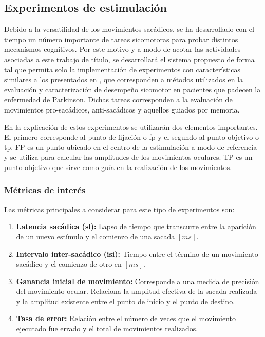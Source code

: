 \documentclass[../main.tex]{subfiles}
\begin{document}
		\subsection{Experimentos de estimulación}
		\label{sub:02_experimentos_de_estimulacion}
			Debido a la versatilidad de los movimientos sacádicos, se ha desarrollado con el tiempo un número importante de tareas sicomotoras para probar distintos mecanísmos cognitivos. Por este motivo y a modo de acotar las actividades asociadas a este trabajo de título, se desarrollará el sistema propuesto de forma tal que permita solo la implementación de experimentos con características similares a los presentados en \cite{article:tests_1, article:tests_2, article:tests_3, article:tests_4, article:tests_5}, que corresponden a métodos utilizados en la evaluación y caracterización de desempeño sicomotor en pacientes que padecen la enfermedad de Parkinson. Dichas tareas corresponden a la evaluación de movimientos pro-sacádicos, anti-sacádicos y aquellos guiados por memoria.

			En la explicación de estos experimentos se utilizarán dos elementos importantes. El primero corresponde al punto de fijación o \acrshort{fp} y el segundo al punto objetivo o \acrshort{tp}. FP es un punto ubicado en el centro de la estimulación a modo de referencia y se utiliza para calcular las amplitudes de los movimientos oculares. TP es un punto objetivo que sirve como guía en la realización de los movimientos. 

			\vspace{-5mm}
			\subsubsection{Métricas de interés}
			\label{ssub:metricas_de_interes}
				Las métricas principales a considerar para este tipo de experimentos son:
				\begin{enumerate}\setlength\itemsep{-0.5em}
				 	\item \textbf{Latencia sacádica (\acrshort{sl}):} Lapso de tiempo que transcurre entre la aparición de un nuevo estímulo y el comienzo de una sacada $[ms]$. 

				 	\item \textbf{Intervalo inter-sacádico (\acrshort{isi}):} Tiempo entre el término de un movimiento sacádico y el comienzo de otro en $[ms]$.
				 	
				 	\item \textbf{Ganancia inicial de movimiento:} Corresponde  a una medida de precisión del movimiento ocular. Relaciona la amplitud efectiva de la sacada realizada y la amplitud existente entre el punto de inicio y el punto de destino.   
				 	
				 	\item \textbf{Tasa de error:} Relación entre el número de veces que el movimiento ejecutado fue errado y el total de movimientos realizados. 

				 \end{enumerate} 
\end{document}
